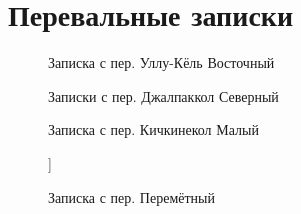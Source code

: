 \section{Перевальные записки}

\begin{figure}[h!]
	\begin{minipage}[h!]{0.49\linewidth}
	\end{minipage}
	\hfill
	\begin{minipage}[h!]{0.49\linewidth}
	\end{minipage}
	\caption{Записка с пер. Уллу-Кёль Восточный}
	\label{pic:ullu_kuel}
\end{figure}

\begin{figure}[h!]
	\begin{minipage}[h!]{0.325\linewidth}
	\end{minipage}
	\hfill
	\begin{minipage}[h!]{0.325\linewidth}
	\end{minipage}
	\hfill
	\begin{minipage}[h!]{0.325\linewidth}
	\end{minipage}
	\caption{Записки с пер. Джалпаккол Северный}
	\label{pic:dzhalpakkol}
\end{figure}

\begin{figure}[h!]
	\begin{minipage}[h!]{0.49\linewidth}
	\end{minipage}
	\hfill
	\begin{minipage}[h!]{0.49\linewidth}
	\end{minipage}
	\caption{Записка с пер. Кичкинекол Малый}
	\label{pic:kichkinekol}
\end{figure}

\begin{figure}[h!]]
	\caption{Записка с пер. Перемётный}
	\label{pic:peremetnyy}
\end{figure}

